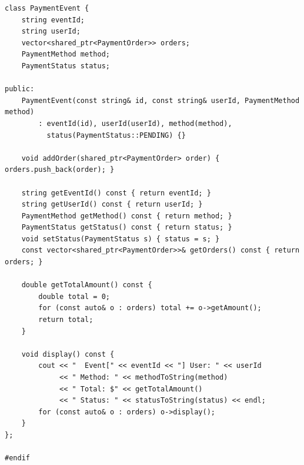 \documentclass[11pt,a4paper]{article}
\begin{document}
\begin{lstlisting}[title={\texttt{models.hpp}}]
class PaymentEvent {
    string eventId;
    string userId;
    vector<shared_ptr<PaymentOrder>> orders;
    PaymentMethod method;
    PaymentStatus status;

public:
    PaymentEvent(const string& id, const string& userId, PaymentMethod method)
        : eventId(id), userId(userId), method(method),
          status(PaymentStatus::PENDING) {}

    void addOrder(shared_ptr<PaymentOrder> order) { orders.push_back(order); }

    string getEventId() const { return eventId; }
    string getUserId() const { return userId; }
    PaymentMethod getMethod() const { return method; }
    PaymentStatus getStatus() const { return status; }
    void setStatus(PaymentStatus s) { status = s; }
    const vector<shared_ptr<PaymentOrder>>& getOrders() const { return orders; }

    double getTotalAmount() const {
        double total = 0;
        for (const auto& o : orders) total += o->getAmount();
        return total;
    }

    void display() const {
        cout << "  Event[" << eventId << "] User: " << userId
             << " Method: " << methodToString(method)
             << " Total: $" << getTotalAmount()
             << " Status: " << statusToString(status) << endl;
        for (const auto& o : orders) o->display();
    }
};

#endif
\end{lstlisting}

\newpage
\end{document}
